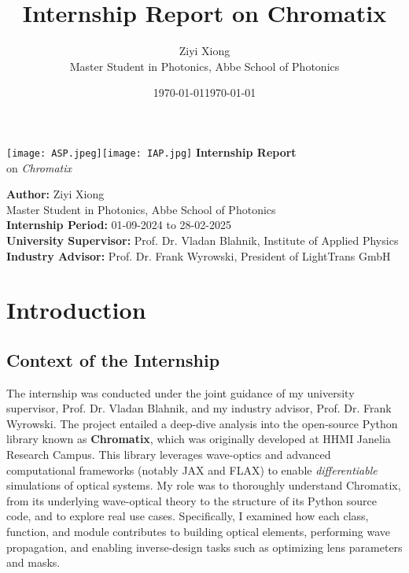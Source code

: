 \documentclass[a4paper,12pt]{report}
\title{\textbf{Internship Report on Chromatix}}
\author{Ziyi Xiong\\Master Student in Photonics, Abbe School of Photonics}
\date{\today}
\begin{document}
\begin{titlepage}
    \centering
    \vspace*{0.5cm}
    \texttt{[image: ASP.jpeg]}\hfill\texttt{[image: IAP.jpg]}
    \vspace{2cm}
    {\Huge\bfseries Internship Report\\[0.5cm]}
    {\Large on \textit{Chromatix}}\\[1.5cm]

    \raggedright
    \large \textbf{Author:} Ziyi Xiong\\
    Master Student in Photonics, Abbe School of Photonics\\[0.3cm]
    \textbf{Internship Period:} 01-09-2024 to 28-02-2025\\[0.3cm]
    \textbf{University Supervisor:} Prof. Dr. Vladan Blahnik, Institute of Applied Physics\\[0.3cm]
    \textbf{Industry Advisor:} Prof. Dr. Frank Wyrowski, President of LightTrans GmbH\\[0.3cm]

    \vfill
    \date{\today}
\end{titlepage}
\clearpage

\pagestyle{fancy}
\fancyhf{}
\rhead{\thepage}
\renewcommand{\headrulewidth}{0.4pt}

\tableofcontents
\clearpage

\chapter{Introduction}
\section{Context of the Internship}
The internship was conducted under the joint guidance of my university supervisor, Prof. Dr. Vladan Blahnik, and my industry advisor, Prof. Dr. Frank Wyrowski. The project entailed a deep-dive analysis into the open-source Python library known as \textbf{Chromatix}, which was originally developed at HHMI Janelia Research Campus. This library leverages wave-optics and advanced computational frameworks (notably JAX and FLAX) to enable \textit{differentiable} simulations of optical systems.\newline
\newline
My role was to thoroughly understand Chromatix, from its underlying wave-optical theory to the structure of its Python source code, and to explore real use cases. Specifically, I examined how each class, function, and module contributes to building optical elements, performing wave propagation, and enabling inverse-design tasks such as optimizing lens parameters and masks.
\end{document}
